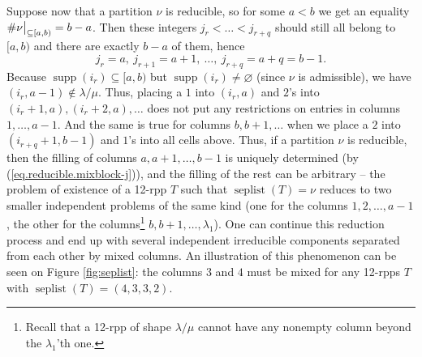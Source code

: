 \documentclass[numbers=enddot,12pt,final,onecolumn,notitlepage]{scrartcl}%
\theoremstyle{definition}
\def\seplist{{\operatorname*{seplist}}} %
\def\seplistvar{{{\nu}}} %
\def\supp{{\operatorname*{supp}}}
\def\lm{{\lambda/\mu}}
\begin{document}
Suppose now that a partition $\seplistvar$ is reducible, so for some $a<b$ we get an equality $\#\nuab=b-a$. Then these integers $j_r<\dots<j_{r+q}$ should still all belong to $[a,b)$ and there are exactly $b-a$ of them, hence 
\begin{equation}
j_r=a,\ j_{r+1}=a+1,\ \dots,\ j_{r+q}=a+q=b-1 .
\label{eq.reducible.mixblock-j}
\end{equation}
Because $\supp(i_r)\subseteq[a,b)$ but $\supp(i_r)\neq\varnothing$ (since $\nu$ is admissible), we have $(i_r,a-1)\notin\lm$. Thus, placing a $1$ into $(i_r,a)$ and $2$'s into $(i_r+1,a),(i_r+2,a),\dots$ does not put any restrictions on entries in columns $1,\dots, a-1$. And the same is true for columns $b,b+1,\dots$ when we place a $2$ into $(i_{r+q}+1,b-1)$ and $1$'s into all cells above. Thus, if a partition $\seplistvar$ is reducible, then the filling of columns $a,a+1,\dots, b-1$ is uniquely determined (by (\ref{eq.reducible.mixblock-j})), and the filling of the rest can be arbitrary -- the problem of existence of a 12-rpp $T$ such that $\seplist(T)=\seplistvar$ reduces to two smaller independent problems of the same kind (one for the columns $1,2,\ldots,a-1$, the other for the columns\footnote{Recall that a 12-rpp of shape $\lm$ cannot have any nonempty column beyond the $\lambda_1$'th one.} $b,b+1,\ldots,\lambda_1$). One can continue this reduction process and end up with several independent irreducible components separated from each other by mixed columns. An illustration of this phenomenon can be seen on Figure \ref{fig:seplist}: the columns $3$ and $4$ must be mixed for any 12-rpps $T$ with $\seplist(T)=(4,3,3,2)$.
\end{document}
